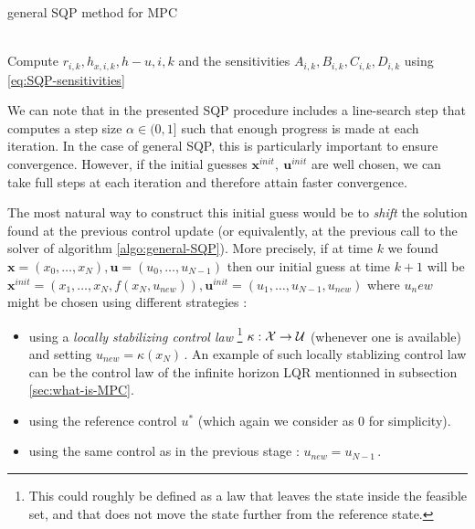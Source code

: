 \documentclass[12pt]{article}
\begin{document}
\begin{algorithm}[H]
	\caption{general SQP method for MPC}
	\label{algo:general-SQP}
	\begin{algorithmic}[1]
	 
	 
	\\
		\qquad \quad Compute $r_{i,k}, h_{x,i,k}, h-{u,i,k}$ and the sensitivities $A_{i,k}, B_{i,k}, C_{i,k}, D_{i,k}$ using \ref{eq:SQP-sensitivities}
		 
	\EndWhile
	\EndProcedure
	\end{algorithmic}
\end{algorithm}
We can note that in \cite{mpc-rti} the presented SQP procedure includes a line-search step that computes a step size $\alpha\in(0,1]$ such that enough progress is made at each iteration.
In the case of general SQP, this is particularly important to ensure convergence.
However, if the initial guesses $\mathbf{x}^{init},~\mathbf{u}^{init}$ are well chosen, we can take full steps at each iteration and therefore attain faster convergence.

The most natural way to construct this initial guess would be to \textit{shift} the solution found at the previous control update (or equivalently, at the previous call to the solver of algorithm \ref{algo:general-SQP}).
More precisely, if at time $k$ we found $\mathbf{x}=(x_0,\dots,x_N),\mathbf{u}=(u_0,\dots,u_{N-1})$ then our initial guess at time $k+1$ will be $\mathbf{x}^{init}=(x_1,\dots,x_N,f(x_N,u_{new})),\mathbf{u}^{init}=(u_1,\dots,u_{N-1},u_{new})$ where $u_new$ might be chosen using different strategies :
\begin{itemize}[label=\textbullet]
	\item using a \textit{locally stabilizing control law} \footnote{This could roughly be defined as a law that leaves the state inside the feasible set, and that does not move the state further from the reference state.} $\kappa:\cal{X}\to\cal{U}$ (whenever one is available) and setting $u_{new}=\kappa(x_N)$\,.
	An example of such locally stablizing control law can be the control law of the infinite horizon LQR mentionned in subsection \ref{sec:what-is-MPC}.

	\item using the reference control $u^*$ (which again we consider as $0$ for simplicity).

 	\item using the same control as in the previous stage : $u_{new}=u_{N-1}$\,.
\end{itemize}
\end{document}
